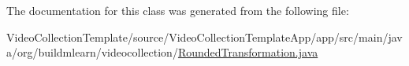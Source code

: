 The documentation for this class was generated from the following file\+:\begin{DoxyCompactItemize}
\item 
Video\+Collection\+Template/source/\+Video\+Collection\+Template\+App/app/src/main/java/org/buildmlearn/videocollection/\hyperlink{RoundedTransformation_8java}{Rounded\+Transformation.\+java}\end{DoxyCompactItemize}

